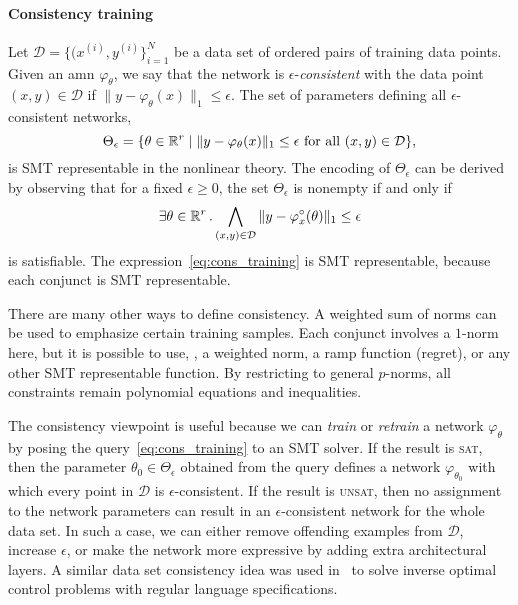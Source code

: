 \documentclass[10pt]{article}
\newcommand{\amn}{\varphi}
\theoremstyle{remark}
\theoremstyle{definition}
\theoremstyle{plain}
\begin{document}
\paragraph{Consistency training}
Let $\mathcal{D}= \{(x^{(i)}, y^{(i)}\}_{i=1}^{N}$ be a data set of ordered
pairs of training data points. 
Given an \acs{amn} $\amn_\theta$, we say that the network is
$\epsilon$-\emph{consistent} with the data point $(x,y)\in\mathcal{D}$ if
$\|y - \amn_\theta(x)\|_1 \leq \epsilon$. 
The set of parameters defining all $\epsilon$-consistent networks,
\[
	\Theta_\epsilon = \{\theta \in \reals^r \mid \|y - \amn_\theta(x) \|_1 \leq
	\epsilon \text{ for all } (x,y)\in\mathcal{D}\},
\]
is SMT representable in the nonlinear theory. The encoding of $\Theta_\epsilon$
can be derived by observing that for a fixed $\epsilon \geq 0$, the set
$\Theta_\epsilon$ is nonempty if and only if
\begin{equation}
	\label{eq:cons_training}
	\exists \theta\in\reals^r\, . \bigwedge_{(x,y)\in\mathcal{D}} \|y -
	\amn_x^\circ(\theta)\|_1 \leq \epsilon
\end{equation}
is satisfiable. The expression~\eqref{eq:cons_training} is SMT representable,
because each conjunct is SMT representable.

There are many other ways to define consistency. A weighted sum of norms can be
used to emphasize certain training samples. Each conjunct involves a $1$-norm
here, but it is possible to use, \eg, a weighted norm, a ramp function
(regret), or any other SMT representable function. By restricting to general
$p$-norms, all constraints remain polynomial equations and inequalities.

The consistency viewpoint is useful because we can \emph{train} or
\emph{retrain} a network $\amn_\theta$ by posing the
query~\eqref{eq:cons_training} to an SMT solver. If the result is \textsc{sat},
then the parameter $\theta_0\in\Theta_\epsilon$ obtained from the query defines
a network $\amn_{\theta_0}$ with which every point in $\mathcal{D}$ is
$\epsilon$-consistent. If the result is \textsc{unsat}, then no
assignment to the network parameters can result in an $\epsilon$-consistent
network for the whole data set. In such a case, we can either remove offending
examples from $\mathcal{D}$, increase $\epsilon$, or make the network more
expressive by adding extra architectural layers. A similar data set consistency
idea was used in~\cite{Papusha:2018a} to solve inverse optimal control problems
with regular language specifications.
\end{document}
